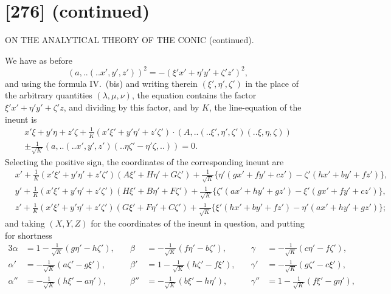 \documentclass[12pt,a4paper]{article}
\newcommand{\qform}[2]{(#1 \mathbin{..} #2)}
\theoremstyle{definition}
\begin{document}
\newpage
\section*{[276] (continued)}
\begin{center}
{\large ON THE ANALYTICAL THEORY OF THE CONIC (continued).}
\end{center}

We have as before
\[
(a,..\!\qform{}{x', y', z'})^{2} = -(\xi'x' + \eta'y' + \zeta'z')^{2},
\]
and using the formula IV.\ (bis) and writing therein $(\xi', \eta', \zeta')$ in the place of the arbitrary quantities $(\lambda, \mu, \nu)$, the equation contains the factor $\xi'x' + \eta'y' + \zeta'z$, and dividing by this factor, and by $K$, the line-equation of the ineunt is
\begin{multline*}
x'\xi + y'\eta + z'\zeta + \frac{1}{K}(x'\xi' + y'\eta' + z'\zeta') \cdot (A,..\!\qform{}{\xi', \eta', \zeta'}\!\qform{}{\xi, \eta, \zeta})\\
\pm \frac{1}{\sqrt{K}}(a,..\!\qform{}{x', y', z'}\!\qform{}{\eta\zeta' - \eta'\zeta,..}) = 0.
\end{multline*}
Selecting the positive sign, the coordinates of the corresponding ineunt are
\begin{align*}
&x' + \frac{1}{K}(x'\xi' + y'\eta' + z'\zeta')(A\xi' + H\eta' + G\zeta')
+ \frac{1}{\sqrt{K}}\{\eta'(gx' + fy' + cz') - \zeta'(hx' + by' + fz')\},\\
&y' + \frac{1}{K}(x'\xi' + y'\eta' + z'\zeta')(H\xi' + B\eta' + F\zeta')
+ \frac{1}{\sqrt{K}}\{\zeta'(ax' + hy' + gz') - \xi'(gx' + fy' + cz')\},\\
&z' + \frac{1}{K}(x'\xi' + y'\eta' + z'\zeta')(G\xi' + F\eta' + C\zeta')
+ \frac{1}{\sqrt{K}}\{\xi'(hx' + by' + fz') - \eta'(ax' + hy' + gz')\};
\end{align*}
and taking $(X, Y, Z)$ for the coordinates of the ineunt in question, and putting for shortness
\begin{alignat*}{3}
\alpha &= 1 - \tfrac{1}{\sqrt{K}}(g\eta' - h\zeta'), &\quad
\beta &= -\tfrac{1}{\sqrt{K}}(f\eta' - b\zeta'), &\quad
\gamma &= -\tfrac{1}{\sqrt{K}}(c\eta' - f\zeta'),\\[4pt]
\alpha' &= -\tfrac{1}{\sqrt{K}}(a\zeta' - g\xi'), &\quad
\beta' &= 1 - \tfrac{1}{\sqrt{K}}(h\zeta' - f\xi'), &\quad
\gamma' &= -\tfrac{1}{\sqrt{K}}(g\zeta' - c\xi'),\\[4pt]
\alpha'' &= -\tfrac{1}{\sqrt{K}}(h\xi' - a\eta'), &\quad
\beta'' &= -\tfrac{1}{\sqrt{K}}(b\xi' - h\eta'), &\quad
\gamma'' &= 1 - \tfrac{1}{\sqrt{K}}(f\xi' - g\eta'),
\end{alignat*}
\end{document}
